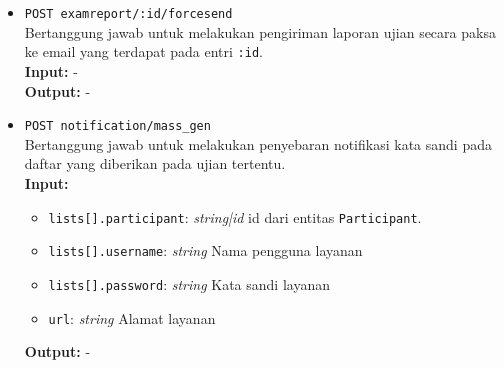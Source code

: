 \begin{itemize}
        \item \texttt{POST examreport/:id/forcesend} \\
            Bertanggung jawab untuk melakukan pengiriman laporan ujian secara
            paksa ke email yang terdapat pada entri \texttt{:id}.\\
            \textbf{Input:} -\\
            \textbf{Output:} -
            
        \item \texttt{POST notification/mass\_gen} \\
            Bertanggung jawab untuk melakukan penyebaran notifikasi kata sandi
            pada daftar yang diberikan pada ujian tertentu.\\
            \textbf{Input:} \begin{itemize}
                \item \texttt{lists[].participant}: \textit{string|id} id dari
                    entitas \texttt{Participant}.
                \item \texttt{lists[].username}: \textit{string} Nama pengguna layanan
                \item \texttt{lists[].password}: \textit{string} Kata sandi layanan
                \item \texttt{url}: \textit{string} Alamat layanan
            \end{itemize}
            \textbf{Output:} -
    \end{itemize}
    
